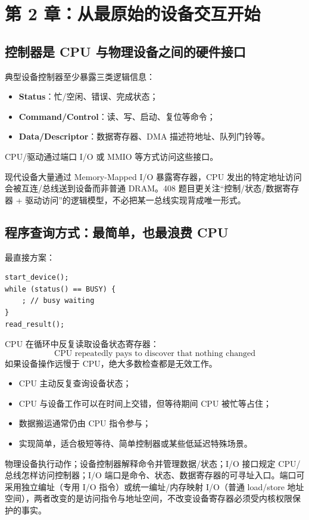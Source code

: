 \documentclass[UTF8,fontset=fandol,11pt,a4paper]{ctexart}
\newcommand{\kw}[1]{\textbf{#1}}
\begin{document}
\section{第 2 章：从最原始的设备交互开始}

\subsection{控制器是 CPU 与物理设备之间的硬件接口}
典型设备控制器至少暴露三类逻辑信息：
\begin{itemize}
  \item \kw{Status}：忙/空闲、错误、完成状态；
  \item \kw{Command/Control}：读、写、启动、复位等命令；
  \item \kw{Data/Descriptor}：数据寄存器、DMA 描述符地址、队列门铃等。
\end{itemize}
CPU/驱动通过端口 I/O 或 MMIO 等方式访问这些接口。

\begin{eng}
现代设备大量通过 Memory-Mapped I/O 暴露寄存器，CPU 发出的特定地址访问会被互连/总线送到设备而非普通 DRAM。408 题目更关注“控制/状态/数据寄存器 + 驱动访问”的逻辑模型，不必把某一总线实现背成唯一形式。
\end{eng}

\subsection{程序查询方式：最简单，也最浪费 CPU}
最直接方案：
\begin{lstlisting}
start_device();
while (status() == BUSY) {
    ; // busy waiting
}
read_result();
\end{lstlisting}

CPU 在循环中反复读取设备状态寄存器：
\[
\boxed{\text{CPU repeatedly pays to discover that nothing changed}}
\]
如果设备操作远慢于 CPU，绝大多数检查都是无效工作。

\begin{exam}
\begin{itemize}
  \item CPU 主动反复查询设备状态；
  \item CPU 与设备工作可以在时间上交错，但等待期间 CPU 被忙等占住；
  \item 数据搬运通常仍由 CPU 指令参与；
  \item 实现简单，适合极短等待、简单控制器或某些低延迟特殊场景。
\end{itemize}

\begin{method}
物理设备执行动作；设备控制器解释命令并管理数据/状态；I/O 接口规定 CPU/总线怎样访问控制器；I/O 端口是命令、状态、数据寄存器的可寻址入口。端口可采用独立编址（专用 I/O 指令）或统一编址/内存映射 I/O（普通 load/store 地址空间），两者改变的是访问指令与地址空间，不改变设备寄存器必须受内核权限保护的事实。
\end{method}
\end{exam}
\end{document}
